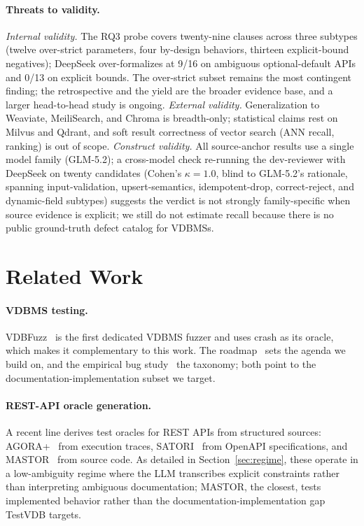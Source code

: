 \documentclass[sigconf]{acmart}
\begin{document}
\paragraph{Threats to validity.}
\emph{Internal validity.} The RQ3 probe covers twenty-nine clauses across three subtypes (twelve over-strict parameters, four by-design behaviors, thirteen explicit-bound negatives); DeepSeek over-formalizes at 9/16 on ambiguous optional-default APIs and 0/13 on explicit bounds. The over-strict subset remains the most contingent finding; the retrospective and the yield are the broader evidence base, and a larger head-to-head study is ongoing. \emph{External validity.} Generalization to Weaviate, MeiliSearch, and Chroma is breadth-only; statistical claims rest on Milvus and Qdrant, and soft result correctness of vector search (ANN recall, ranking) is out of scope. \emph{Construct validity.} All source-anchor results use a single model family (GLM-5.2); a cross-model check re-running the dev-reviewer with DeepSeek on twenty candidates (Cohen's $\kappa = 1.0$, blind to GLM-5.2's rationale, spanning input-validation, upsert-semantics, idempotent-drop, correct-reject, and dynamic-field subtypes) suggests the verdict is not strongly family-specific when source evidence is explicit; we still do not estimate recall because there is no public ground-truth defect catalog for VDBMSs.

\section{Related Work} \label{sec:related}

\paragraph{VDBMS testing.} VDBFuzz~\cite{vdbfuzz26} is the first dedicated VDBMS fuzzer and uses crash as its oracle, which makes it complementary to this work. The roadmap~\cite{roadmap25} sets the agenda we build on, and the empirical bug study~\cite{bugstudy25} the taxonomy; both point to the documentation-implementation subset we target.

\paragraph{REST-API oracle generation.} A recent line derives test oracles for REST APIs from structured sources: AGORA+~\cite{agoraplus25} from execution traces, SATORI~\cite{satori25} from OpenAPI specifications, and MASTOR~\cite{mastor26} from source code. As detailed in Section~\ref{sec:regime}, these operate in a low-ambiguity regime where the LLM transcribes explicit constraints rather than interpreting ambiguous documentation; MASTOR, the closest, tests implemented behavior rather than the documentation-implementation gap TestVDB targets.
\end{document}

